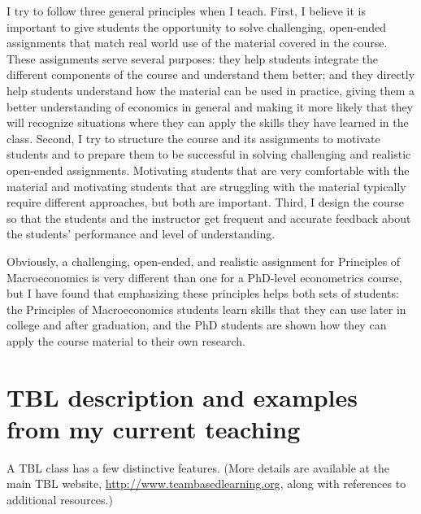 \documentclass[12pt]{article}%
\begin{document}
I try to follow three general principles when I teach. First, I
believe it is important to give students the opportunity to solve
challenging, open-ended assignments that match real world use of the
material covered in the course. These assignments serve several
purposes: they help students integrate the different components of the
course and understand them better; and they directly help students
understand how the material can be used in practice, giving them a
better understanding of economics in general and making it more likely
that they will recognize situations where they can apply the skills
they have learned in the class. Second, I try to structure the course
and its assignments to motivate students and to prepare them to be
successful in solving challenging and realistic open-ended
assignments. Motivating students that are very comfortable with the
material and motivating students that are struggling with the material
typically require different approaches, but both are important. Third,
I design the course so that the students and the instructor get
frequent and accurate feedback about the students' performance and
level of understanding.

Obviously, a challenging, open-ended, and realistic assignment for
Principles of Macroeconomics is very different than one for a
PhD-level econometrics course, but I have found that emphasizing these
principles helps both sets of students: the Principles of
Macroeconomics students learn skills that they can use later in
college and after graduation, and the PhD students are shown how they
can apply the course material to their own research.

\section*{TBL description and examples from my current teaching}

A TBL class has a few distinctive features. (More details are
available at the main TBL website,
\url{http://www.teambasedlearning.org}, along with references to
additional resources.)
\end{document}
